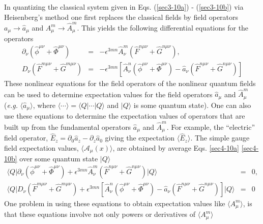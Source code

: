 \documentclass[a4paper,aps,showpacs]{revtex4}
\begin{document}
In quantizing the classical system given in Eqs. (\ref{sec3-10a}) -
(\ref{sec3-10b}) via Heisenberg's method one first replaces the
classical fields by field operators $a_{\mu} \rightarrow \hat{a}_\mu$
and $A^m_{\mu} \rightarrow \hat{A}^m_\mu$. This yields the
following differential equations for the operators
\begin{eqnarray}
  \partial_\nu \left( \hat{\phi}^{\mu\nu} + \hat{\Phi}^{\mu\nu} \right) & = &
  -\epsilon^{3mn} \hat A^m_\nu
  \left(
  \hat F^{n\mu\nu} + \hat G^{n\mu\nu}
  \right),
\label{sec4-10a}\\
  D_\nu \left( \hat F^{m\mu\nu} + \hat G^{m\mu\nu} \right) & = &
  -\epsilon^{3mn}
  \left[
  \hat A^n_\nu \left( \hat \phi^{\mu\nu} + \hat \Phi^{\mu\nu} \right) -
  \hat a_\nu \left( \hat F^{n\mu\nu} + \hat G^{n\mu\nu} \right)
  \right]
\label{sec4-10b}
\end{eqnarray}
These nonlinear equations for the field operators of
the nonlinear quantum fields can be used to determine
expectation values for the field operators $\hat a_\mu$ and
$\hat A^m_\mu$ ({\it e.g.} $\langle \hat a_\mu \rangle$, where
$\langle \cdots \rangle = \langle Q | \cdots | Q \rangle$ and
$| Q \rangle$ is some quantum state). One can also use these
equations to determine the expectation values of operators
that are built up from the fundamental operators $\hat a_\mu$
and $\hat A^m_\mu$. For example, the ``electric'' field
operator, $\hat E_z = \partial _0 \hat a_z - \partial _z \hat a_0$
giving the expectation $\langle \hat E_z \rangle$.
The simple gauge field expectation values,
$\langle \mathcal{A}_\mu (x) \rangle$, are obtained by
average Eqs. \eqref{sec4-10a} \eqref{sec4-10b} over some
quantum state $| Q \rangle$
\begin{eqnarray}
  \biggl \langle Q \biggl |
  \partial_\nu \left( \hat {\phi}^{\mu\nu} + \hat{\Phi}^{\mu\nu} \right)
  + \epsilon^{3mn} \hat A^m_\nu
  \left(
  \hat F^{n\mu\nu} + \hat G^{n\mu\nu}
  \right)
  \biggl | Q \biggl \rangle & = & 0,
\label{sec4-20a}\\
  \biggl \langle Q \biggl |
  D_\nu \left( \hat F^{m\mu\nu} + \hat G^{m\mu\nu} \right)
  + \epsilon^{3mn}
  \left[
  \hat A^n_\nu \left( \hat {\phi}^{\mu\nu} + \hat \Phi^{\mu\nu} \right) -
  \hat a_\nu \left( \hat F^{n\mu\nu} + \hat G^{n\mu\nu} \right)
  \right]
  \biggl | Q \biggl \rangle & = & 0
\label{sec4-20b}
\end{eqnarray}
One problem in using these equations to obtain expectation
values like $\langle A^m_\mu \rangle$, is that these equations
involve not only powers or derivatives of $\langle A^m_\mu \rangle$
\end{document}
